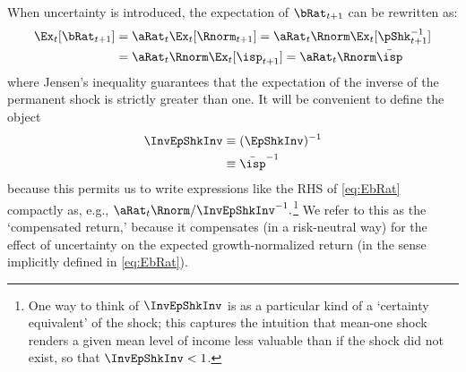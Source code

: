\documentclass[BufferStockTheory]{subfiles}
\begin{document}
When uncertainty is introduced, the expectation of $\bRat_{t+1}$ can be rewritten as:  
\begin{align}
  \Ex_{t}[\bRat_{t+1}]  & =  \aRat_{t}\Ex_{t}[\Rnorm_{t+1}] = \aRat_{t}\Rnorm\Ex_{t}[\pShk_{t+1}^{-1}] \label{eq:EbRat}
  \\ & = \aRat_{t}\Rnorm\Ex_{t}[\isp_{t+1}] = \aRat_{t}\Rnorm\bar{\isp} %
\end{align}
where Jensen's inequality guarantees that the expectation of the inverse of the permanent
shock is strictly greater than one.  It will be convenient to define the object \hypertarget{InvEpShkInv}{}
\begin{align*}
  \InvEpShkInv  & \equiv  (\EpShkInv)^{-1}
  \\ &                  \equiv \bar{\isp}^{-1}  %
\end{align*}
because this permits us to write expressions like the RHS of
\eqref{eq:EbRat} compactly as, e.g., $\aRat_{t}\Rnorm/
\InvEpShkInv^{-1}.$\footnote{One way to think of $\InvEpShkInv$ is as
  a particular kind of a `certainty equivalent' of the shock; this
  captures the intuition that mean-one shock renders a given mean
  level of income less valuable than if the shock did not exist, so
  that $\InvEpShkInv < 1$.}  We refer to this as the `compensated return,' because it compensates (in a risk-neutral way) for the effect of
uncertainty on the expected growth-normalized return (in the sense implicitly defined in
\eqref{eq:EbRat}).
\end{document}
